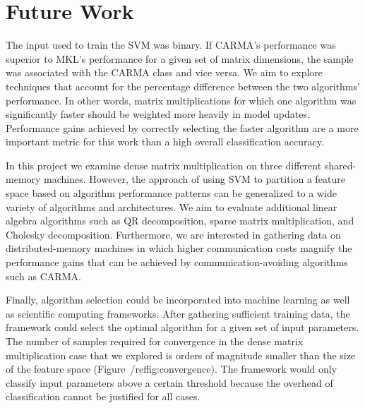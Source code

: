 \section{Future Work}
\label{s:future}

The input used to train the SVM was binary.
If CARMA's performance was superior to MKL's performance for a given set of matrix dimensions, the sample was associated with the CARMA class and vice versa.
We aim to explore techniques that account for the percentage difference between the two algorithms' performance.
In other words, matrix multiplications for which one algorithm was significantly faster should be weighted more heavily in model updates.
Performance gains achieved by correctly selecting the faster algorithm are a more important metric for this work than a high overall classification accuracy.

In this project we examine dense matrix multiplication on three different shared-memory machines.
However, the approach of using SVM to partition a feature space based on algorithm performance patterns can be generalized to a wide variety of algorithms and architectures.
We aim to evaluate additional linear algebra algorithms such as QR decomposition, sparse matrix multiplication, and Cholesky decomposition.
Furthermore, we are interested in gathering data on distributed-memory machines in which higher communication costs magnify the performance gains that can be achieved by communication-avoiding algorithms such as CARMA.

Finally, algorithm selection could be incorporated into machine learning as well as scientific computing frameworks.
After gathering sufficient training data, the framework could select the optimal algorithm for a given set of input parameters.
The number of samples required for convergence in the dense matrix multiplication case that we explored is orders of magnitude smaller than the size of the feature space (Figure~/ref{fig:convergence}).
The framework would only classify input parameters above a certain threshold because the overhead of classification cannot be justified for all cases.
